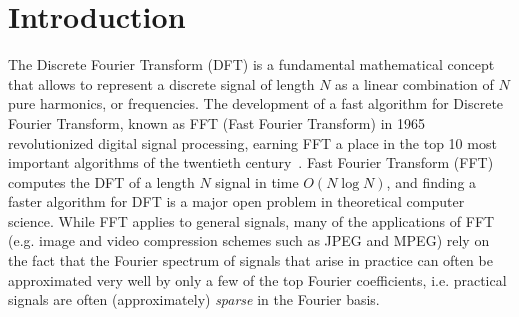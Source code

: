 
\section{Introduction}

The Discrete Fourier Transform (DFT) is a fundamental mathematical concept that allows to represent a discrete signal of length $N$ as a linear combination of $N$ pure harmonics, or frequencies. The development of a fast algorithm for Discrete Fourier Transform, known as FFT (Fast Fourier Transform) in 1965 revolutionized digital signal processing, earning FFT a place in the top 10 most important algorithms of the twentieth century~\cite{citeulike:6838680}. Fast Fourier Transform (FFT) computes the DFT of a length $N$ signal in time $O(N\log N)$, and finding a faster algorithm for DFT is a major open problem in theoretical computer science.  While FFT applies to general signals, many of the applications of FFT (e.g. image and video compression schemes such as JPEG and MPEG) rely on the fact that  the Fourier spectrum of signals that arise in practice can often be approximated very well by only a few of the top Fourier coefficients, i.e. practical signals are often (approximately) {\em sparse} in the Fourier basis. 


